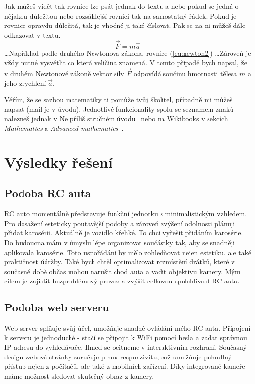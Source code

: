 \documentclass[12pt, a4paper,
oneside,      %
openany
]{report}
\begin{document}
	Jak můžeš vidět tak rovnice lze psát jednak do textu a nebo pokud se jedná o nějakou důležitou nebo rozsáhlejší rovnici tak na samostatný řádek. Pokud je rovnice opravdu důležitá, tak je vhodné ji také číslovat. Pak se na ni můžeš dále odkazovat v textu.
	\begin{equation}
		\vec{F} = m \vec{a}
		\label{eq:newton2}
	\end{equation}
	\dots Například podle druhého Newtonova zákona, rovnice (\ref{eq:newton2}) \dots Zároveň je vždy nutné vysvětlit co která veličina znamená. V tomto případě bych napsal, že v druhém Newtonově zákoně vektor síly $\vec F$ odpovídá součinu hmotnosti tělesa $m$ a jeho zrychlení $\vec a$. 
	
	Věřím, že se sazbou matematiky ti pomůže tvůj školitel, případně mi můžeš napsat (mail je v úvodu). Jednotlivé funkcionality spolu se seznamem znaků nalezneš jednak v Ne příliš stručném úvodu~\cite{LaTeXprirucka} nebo na Wikibooks v sekcích \emph{Mathematics} a \emph{Advanced mathematics}~\cite{wikibooksLaTeX}.
	
	\chapter{Výsledky řešení}

    \section{Podoba RC auta}
    \noindent RC auto momentálně představuje funkční jednotku s minimalistickým vzhledem. Pro dosažení esteticky poutavější podoby a zároveň zvýšení odolnosti plánuji přidat karosérii. Aktuálně je vozidlo křehké. To chci vyřešit přidáním karosérie. Do budoucna mám v úmyslu lépe organizovat součástky tak, aby se snadněji aplikovala karosérie. Toto uspořádání by mělo zohledňovat nejen estetiku, ale také praktičnost údržby. Také bych chtěl optimalizovat rozmístění drátků, které v současné době občas mohou narušit chod auta a vadit objektivu kamery. Mým cílem je zajistit bezproblémový provoz a zvýšit celkovou spolehlivost RC auta.
    
    \section{Podoba web serveru}

    \noindent Web server splňuje svůj účel, umožňuje snadné ovládání mého RC auta. Připojení k serveru je jednoduché - stačí se připojit k WiFi pomocí hesla a zadat správnou IP adresu do vyhledávače. Ihned se ocitneme v interaktivním rozhraní. Současný design webové stránky zaručuje plnou responzivitu, což umožňuje pohodlný přístup nejen z počítačů, ale také z mobilních zařízení. Díky integrované kameře máme možnost sledovat skutečný obraz z kamery.
 
\end{document}
